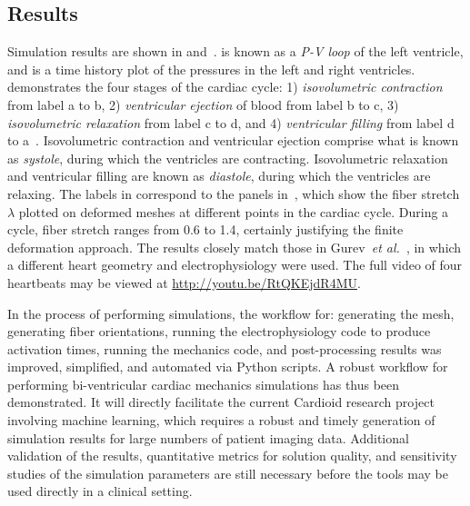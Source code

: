 \subsection{Results}
\label{Results}

Simulation results are shown in  and~.  is known as a \textit{P-V loop} of the left ventricle, and  is a time history plot of the pressures in the left and right ventricles.  demonstrates the four stages of the cardiac cycle: 1) \textit{isovolumetric contraction} from label a to b, 2) \textit{ventricular ejection} of blood from label b to c, 3) \textit{isovolumetric relaxation} from label c to d, and 4) \textit{ventricular filling} from label d to a~\cite{slideshare}. Isovolumetric contraction and ventricular ejection comprise what is known as \textit{systole}, during which the ventricles are contracting. Isovolumetric relaxation and ventricular filling are known as \textit{diastole}, during which the ventricles are relaxing. The labels in  correspond to the panels in~, which show the fiber stretch $\lambda$ plotted on deformed meshes at different points in the cardiac cycle. During a cycle, fiber stretch ranges from 0.6 to 1.4, certainly justifying the finite deformation approach. The results closely match those in Gurev~\textit{et al.}~\cite{gurev_2015}, in which a different heart geometry and electrophysiology were used. The full video of four heartbeats may be viewed at \href{http://youtu.be/RtQKEjdR4MU}{{\url{http://youtu.be/RtQKEjdR4MU}}}.

In the process of performing simulations, the workflow for: generating the mesh, generating fiber orientations, running the electrophysiology code to produce activation times, running the mechanics code, and post-processing results was improved, simplified, and automated via Python scripts. A robust workflow for performing bi-ventricular cardiac mechanics simulations has thus been demonstrated. It will directly facilitate the current Cardioid research project involving machine learning, which requires a robust and timely generation of simulation results for large numbers of patient imaging data. Additional validation of the results, quantitative metrics for solution quality, and sensitivity studies of the simulation parameters are still necessary before the tools may be used directly in a clinical setting.

